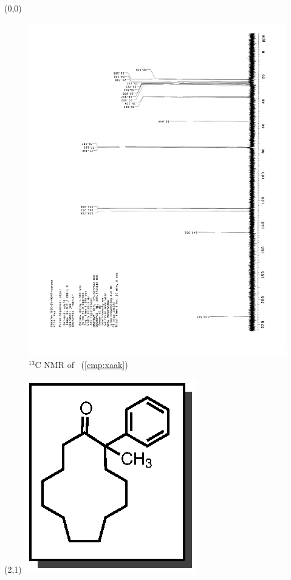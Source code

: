 \clearpage
\begin{textblock}{20}(0,0)
\begin{figure}[htb]
\caption{$^{13}$C NMR of  \CMPxaak\ (\ref{cmp:xaak})}
\includegraphics[scale=0.75, trim = 0mm 0mm 0mm 5mm,
clip]{chp_asymmetric/images/nmr/xaakC}
\vspace{-100pt}
\end{figure}
\end{textblock}
\begin{textblock}{1}(2,1)
\includegraphics[scale=0.8, angle=90]{chp_asymmetric/images/xaak}
\end{textblock}
\clearpage

